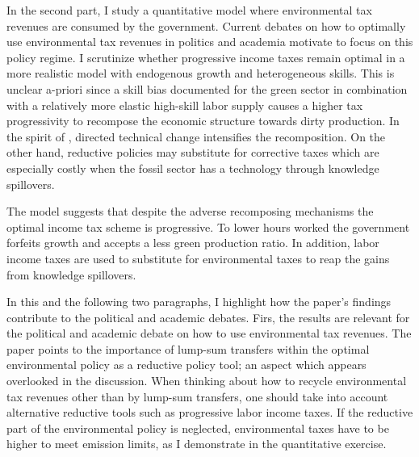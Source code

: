 In the second part, I study a quantitative model where environmental tax revenues are consumed by the government. Current debates on how to optimally use environmental tax revenues in politics \citep{Baker2017TheDividends} and academia \citep[e.g.][]{Fried2018TheGenerations, Carattini2018} motivate to focus on this policy regime. I scrutinize whether progressive income taxes remain optimal in a more realistic model with endogenous growth and heterogeneous skills. This is unclear a-priori since a skill bias documented for the green sector \citep{Consoli2016DoCapital} in combination with a relatively more elastic high-skill labor supply causes a higher tax progressivity to recompose the economic structure towards dirty production. In the spirit of \cite{Acemoglu2002DirectedChange}, directed technical change intensifies the recomposition.
On the other hand, reductive policies may substitute for corrective taxes  which are especially costly when the fossil sector has a technology  through knowledge spillovers.  %

 The model suggests that despite the adverse recomposing mechanisms the optimal income tax scheme is progressive. To lower hours worked the government forfeits growth and accepts a less green production ratio. In addition, labor income taxes are used to substitute for environmental taxes to reap the gains from knowledge spillovers. 
 

In this and the following two paragraphs, I highlight how the paper's findings contribute to the political and academic debates. 
Firs, the results are relevant for the political and academic debate on how  to use environmental tax revenues. The paper points to the importance of lump-sum transfers within the optimal environmental policy as a reductive policy tool; an aspect which appears overlooked in the discussion.%
When thinking about how to recycle environmental tax revenues other than by lump-sum transfers,  one should take into account alternative reductive tools such as progressive labor income taxes. 
If the reductive part of the environmental policy is neglected, environmental taxes have to be higher to meet emission limits, as I demonstrate in the quantitative exercise.

